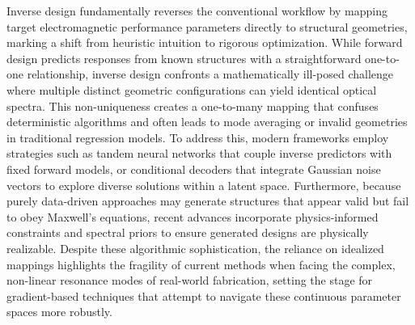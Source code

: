 Inverse design fundamentally reverses the conventional workflow by mapping target electromagnetic performance parameters directly to structural geometries, marking a shift from heuristic intuition to rigorous optimization. While forward design predicts responses from known structures with a straightforward one-to-one relationship, inverse design confronts a mathematically ill-posed challenge where multiple distinct geometric configurations can yield identical optical spectra. This non-uniqueness creates a one-to-many mapping that confuses deterministic algorithms and often leads to mode averaging or invalid geometries in traditional regression models. To address this, modern frameworks employ strategies such as tandem neural networks that couple inverse predictors with fixed forward models, or conditional decoders that integrate Gaussian noise vectors to explore diverse solutions within a latent space. \citep{doi_10_1364_josab_497661_d333080a} \citep{doi_10_1038_s41467_025_57516_z_7c69e056} Furthermore, because purely data-driven approaches may generate structures that appear valid but fail to obey Maxwell's equations, recent advances incorporate physics-informed constraints and spectral priors to ensure generated designs are physically realizable. Despite these algorithmic sophistication, the reliance on idealized mappings highlights the fragility of current methods when facing the complex, non-linear resonance modes of real-world fabrication, setting the stage for gradient-based techniques that attempt to navigate these continuous parameter spaces more robustly. \citep{doi_10_1088_1361_6463_ad3e05_d24e0a0a} \citep{doi_10_23919_piers_fall62445_2025_11394631_4fdb8517} \citep{doi_10_71465_fapm546_bda368a5}

